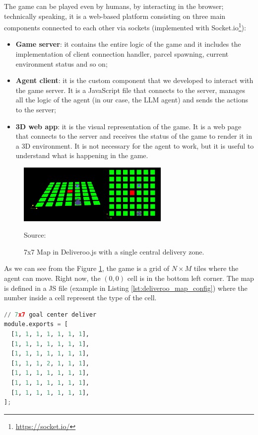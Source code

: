 The game can be played even by humans, by interacting in the browser;
technically speaking, it is a web-based platform consisting on three main components
connected to each other via sockets (implemented with Socket.io\footnote{\url{https://socket.io/}}):
\begin{itemize}
  \item \textbf{Game server}: it contains the entire logic of the game and it includes
    the implementation of client connection handler, parcel spawning, current environment
    status and so on;

  \item \textbf{Agent client}: it is the custom component that we developed to interact
    with the game server. It is a JavaScript file that connects to the server, manages
    all the logic of the agent (in our case, the LLM agent) and sends the
    actions to the server;

  \item \textbf{3D web app}: it is the visual representation of the game. It is
    a web page that connects to the server and receives the status of the game
    to render it in a 3D environment. It is not necessary for the agent to work,
    but it is useful to understand what is happening in the game.
\end{itemize}

\begin{figure}[h!]
  \centering
  \includegraphics[width=0.65\textwidth]{images/deliveroo_js.png}
  \caption{7x7 Map in Deliveroo.js with a single central delivery zone.}
  { Source: } \label{fig:deliveroo_js}
\end{figure}

As we can see from the Figure \ref{fig:deliveroo_js}, the game is a grid of
$N \times M$ tiles where the agent can move. Right now, the $(0, 0)$ cell is in
the bottom left corner. The map is defined in a JS file (example in Listing
\ref{lst:deliveroo_map_config}) where the number inside a cell represent the type
of the cell.

\begin{lstlisting}[language=Python, caption={Example of a configuration for a 7x7 map with a single central delivery zone}, label={lst:deliveroo_map_config}]
  // 7x7 goal center deliver
module.exports = [
  [1, 1, 1, 1, 1, 1, 1],
  [1, 1, 1, 1, 1, 1, 1],
  [1, 1, 1, 1, 1, 1, 1],
  [1, 1, 1, 2, 1, 1, 1],
  [1, 1, 1, 1, 1, 1, 1],
  [1, 1, 1, 1, 1, 1, 1],
  [1, 1, 1, 1, 1, 1, 1],
];
\end{lstlisting}

